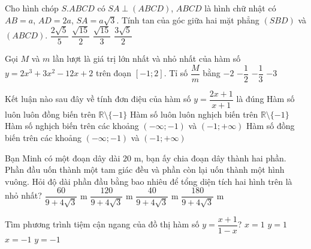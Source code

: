 \begin{ex}%
	Cho hình chóp $S.ABCD$ có $SA\perp (ABCD)$, $ABCD$ là hình chữ nhật có $AB=a$, $AD = 2a$, $SA = a\sqrt 3 $. Tính tan của góc giữa hai mặt phẳng $(SBD)$ và $(ABCD)$.
	\choice
	{$ \dfrac{{2\sqrt 5}}{5}$}
	{\True $ \dfrac{\sqrt{15}}{2}$}
	{$ \dfrac{\sqrt{15}}{3}$}
	{$ \dfrac{3\sqrt 5}{2}$}
\end{ex}
\begin{ex}%
	Gọi $M$ và $m$ lần lượt là giá trị lớn nhất và nhỏ nhất của hàm số $ y = 2x^3+ 3x^2-12x+2$ trên đoạn $ [-1;2]$. Tỉ số $\dfrac{M}{m}$ bằng
	\choice
	{$-2 $}
	{$-\dfrac{1}{2}$}
	{$-\dfrac{1}{3}$}
	{\True $-3$}
\end{ex}
\begin{ex}%
	Kết luận nào sau đây về tính đơn điệu của hàm số $y=\dfrac{2x+1}{x+1}$ là đúng
	\choice
	{Hàm số luôn luôn đồng biến trên $ \mathbb{R}\setminus \{-1\}$}
	{Hàm số luôn luôn nghịch biến trên $ \mathbb{R}\setminus \{-1\}$}
	{Hàm số nghịch biến trên các khoảng $(-\infty;-1)$ và $(-1;+\infty)$}
	{\True Hàm số đồng biến trên các khoảng $ (-\infty;-1)$ và $(-1;+\infty)$}
\end{ex}
\begin{ex}%
	Bạn Minh có một đoạn dây dài $20$ m, bạn ấy chia đoạn dây thành hai phần. Phần đầu uốn thành một tam giác đều và phần còn lại uốn thành một hình vuông. Hỏi độ dài phần đầu bằng bao nhiêu để tổng diện tích hai hình trên là nhỏ nhất?
	\choice
	{$ \dfrac{60}{9+4\sqrt 3}$ m}
	{$ \dfrac{120}{9+4\sqrt 3}$ m}
	{$ \dfrac{40}{9+4\sqrt 3}$ m}
	{\True $ \dfrac{180}{9 + 4\sqrt 3}$ m}
\end{ex}
\begin{ex}%
	Tìm phương trình tiệm cận ngang của đồ thị hàm số $y=\dfrac{x+1}{1-x}$?
	\choice
	{$x=1$}
	{$y=1$}
	{$x=-1$}
	{\True $y=-1$}
\end{ex}

